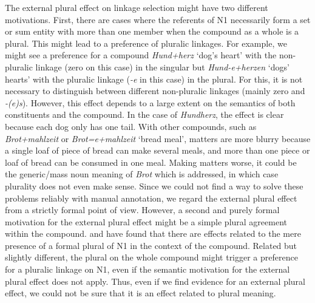 The external plural effect on linkage selection might have two different motivations.
First, there are cases where the referents of N1 necessarily form a set or sum entity with more than one member when the compound as a whole is a plural.
This might lead to a preference of pluralic linkages.
For example, we might see a preference for a compound \textit{Hund+herz} `dog's heart' with the non-pluralic linkage (zero on this case) in the singular but \textit{Hund-e+herzen} `dogs' hearts' with the pluralic linkage (\textit{-e} in this case) in the plural.
For this, it is not necessary to distinguish between different non-pluralic linkages (mainly zero and \textit{-(e)s}).
However, this effect depends to a large extent on the semantics of both constituents and the compound.
In the case of \textit{Hundherz}, the effect is clear because each dog only has one tail.
With other compounds, such as \textit{Brot+mahlzeit} or \textit{Brot=e+mahlzeit} `bread meal', matters are more blurry because a single loaf of piece of bread can make several meals, and more than one piece or loaf of bread can be consumed in one meal.
Making matters worse, it could be the generic\slash mass noun meaning of \textit{Brot} which is addressed, in which case plurality does not even make sense.
Since we could not find a way to solve these problems reliably with manual annotation, we regard the external plural effect from a strictly formal point of view.
However, a second and purely formal motivation for the external plural effect might be a simple plural agreement within the compound.
\textcite{BangaEa2013a} and \textcite{BangaEa2013b} have found that there are effects related to the mere presence of a formal plural of N1 in the context of the compound.
Related but slightly different, the plural on the whole compound might trigger a preference for a pluralic linkage on N1, even if the semantic motivation for the external plural effect does not apply.
Thus, even if we find evidence for an external plural effect, we could not be sure that it is an effect related to plural meaning.


